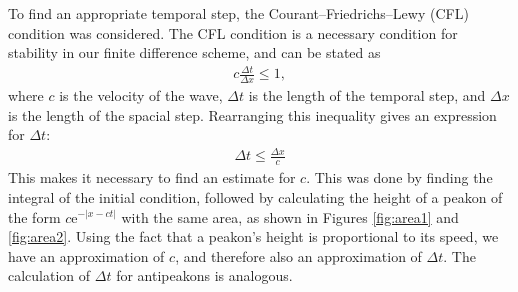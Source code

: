 To find an appropriate temporal step, the Courant–Friedrichs–Lewy (CFL) condition was considered. The CFL condition is a necessary condition for stability in our finite difference scheme, and can be stated as
\begin{align}
c\frac{\Delta t}{\Delta x} \leq 1,
\end{align}
where $c$ is the velocity of the wave, $\Delta t$ is the length of the temporal step, and $\Delta x$ is the length of the spacial step. Rearranging this inequality gives an expression for $\Delta t$:
\begin{align}
\Delta t \leq \frac{\Delta x}{c}
\end{align}
This makes it necessary to find an estimate for $c$. This was done by finding the integral of the initial condition, followed by calculating the height of a peakon of the form $c\text{e}^{-|x-ct|}$ with the same area, as shown in Figures \ref{fig:area1} and \ref{fig:area2}. Using the fact that a peakon's height is proportional to its speed, we have an approximation of $c$, and therefore also an approximation of $\Delta t$. The calculation of $\Delta t$ for antipeakons is analogous. \\
